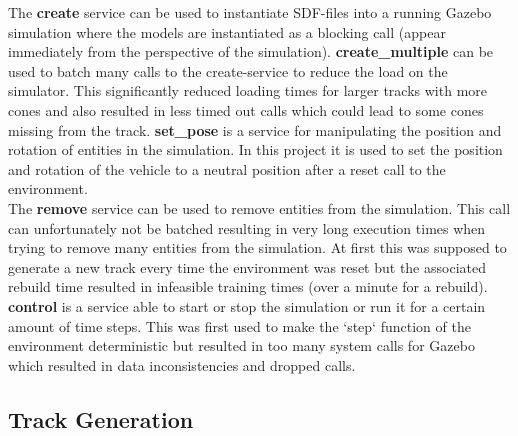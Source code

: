 The \textbf{create} service can be used to instantiate SDF-files into a running Gazebo simulation where the models are instantiated as a blocking call (appear immediately from the perspective of the simulation). \textbf{create\_multiple} can be used to batch many calls to the create-service to reduce the load on the simulator. This significantly reduced loading times for larger tracks with more cones and also resulted in less timed out calls which could lead to some cones missing from the track. \textbf{set\_pose} is a service for manipulating the position and rotation of entities in the simulation. In this project it is used to set the position and rotation of the vehicle to a neutral position after a reset call to the environment.\\
The \textbf{remove} service can be used to remove entities from the simulation. This call can unfortunately not be batched resulting in very long execution times when trying to remove many entities from the simulation. At first this was supposed to generate a new track every time the environment was reset but the associated rebuild time resulted in infeasible training times (over a minute for a rebuild).\\
\textbf{control} is a service able to start or stop the simulation or run it for a certain amount of time steps. This was first used to make the `step` function of the environment deterministic but resulted in too many system calls for Gazebo which resulted in data inconsistencies and dropped calls.

\subsection{Track Generation}

